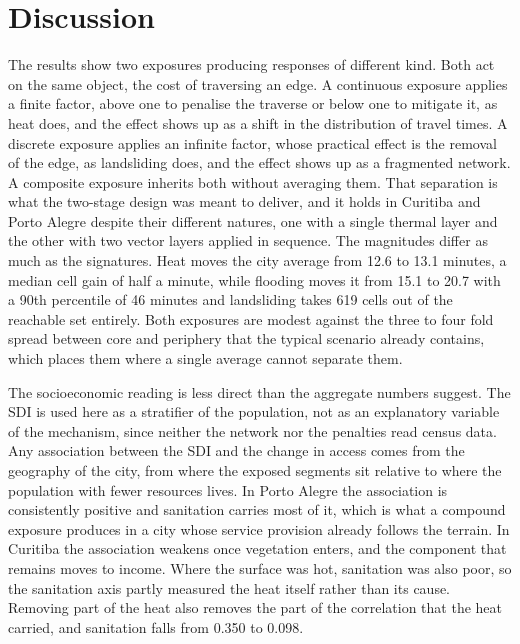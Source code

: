 \section{Discussion}
\label{sec:discussion}

The results show two exposures producing responses of different kind. Both act on the same object, the cost of traversing an edge. A continuous exposure applies a finite factor, above one to penalise the traverse or below one to mitigate it, as heat does, and the effect shows up as a shift in the distribution of travel times. A discrete exposure applies an infinite factor, whose practical effect is the removal of the edge, as landsliding does, and the effect shows up as a fragmented network. A composite exposure inherits both without averaging them. That separation is what the two-stage design was meant to deliver, and it holds in Curitiba and Porto Alegre despite their different natures, one with a single thermal layer and the other with two vector layers applied in sequence. The magnitudes differ as much as the signatures. Heat moves the city average from 12.6 to 13.1 minutes, a median cell gain of half a minute, while flooding moves it from 15.1 to 20.7 with a 90th percentile of 46 minutes and landsliding takes 619 cells out of the reachable set entirely. Both exposures are modest against the three to four fold spread between core and periphery that the typical scenario already contains, which places them where a single average cannot separate them.

The socioeconomic reading is less direct than the aggregate numbers suggest. The SDI is used here as a stratifier of the population, not as an explanatory variable of the mechanism, since neither the network nor the penalties read census data. Any association between the SDI and the change in access comes from the geography of the city, from where the exposed segments sit relative to where the population with fewer resources lives. In Porto Alegre the association is consistently positive and sanitation carries most of it, which is what a compound exposure produces in a city whose service provision already follows the terrain. In Curitiba the association weakens once vegetation enters, and the component that remains moves to income. Where the surface was hot, sanitation was also poor, so the sanitation axis partly measured the heat itself rather than its cause. Removing part of the heat also removes the part of the correlation that the heat carried, and sanitation falls from 0.350 to 0.098.

